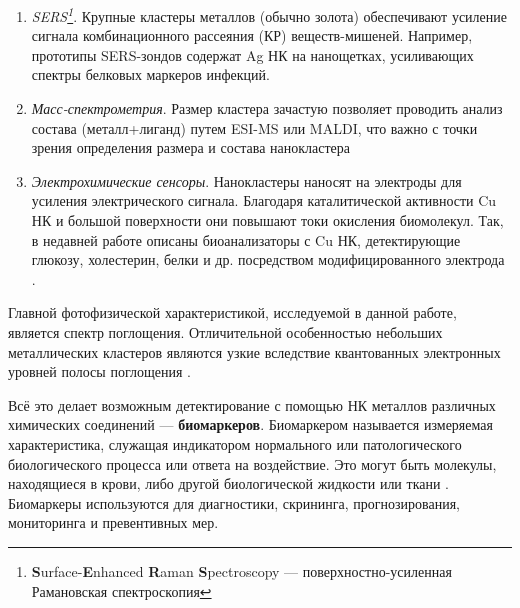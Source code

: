 \documentclass[a4paper,12pt]{article}
\begin{document}
\begin{onehalfspace}
\begin{enumerate}
		\item \textit{SERS\footnote{\textbf{S}urface-\textbf{E}nhanced \textbf{R}aman \textbf{S}pectroscopy — поверхностно-усиленная Рамановская спектроскопия}}. Крупные кластеры металлов (обычно золота) обеспечивают усиление сигнала комбинационного рассеяния (КР) веществ-мишеней. Например, прототипы SERS-зондов содержат Ag НК на нанощетках, усиливающих спектры белковых маркеров инфекций. \cite{Demirel2018}
		
		\item \textit{Масс-спектрометрия}. Размер кластера зачастую позволяет проводить анализ состава (металл+лиганд) путем ESI-MS или MALDI, что важно с точки зрения определения размера и состава нанокластера \cite{Gao2023}
		
		\item \textit{Электрохимические сенсоры}. Нанокластеры наносят на электроды для усиления электрического сигнала. Благодаря каталитической активности Cu НК и большой поверхности они повышают токи окисления биомолекул. Так, в недавней работе описаны биоанализаторы с Cu НК, детектирующие глюкозу, холестерин, белки и др. посредством модифицированного электрода \cite{Han2025}.
	\end{enumerate}
	
	Главной фотофизической характеристикой, исследуемой в данной работе, является спектр поглощения. Отличительной особенностью небольших металлических кластеров являются узкие вследствие квантованных электронных уровней полосы поглощения  \cite{Wegeberg2021}.
	
	Всё это делает возможным детектирование с помощью НК металлов различных химических соединений — \textbf{биомаркеров}. Биомаркером называется измеряемая характеристика, служащая индикатором нормального или патологического биологического процесса или ответа на воздействие. Это могут быть молекулы, находящиеся в крови, либо другой биологической жидкости или ткани \cite{Califf2018}. Биомаркеры используются для диагностики, скрининга, прогнозирования, мониторинга и превентивных мер. 
	
	\newpage
	

\end{onehalfspace}
\end{document}
